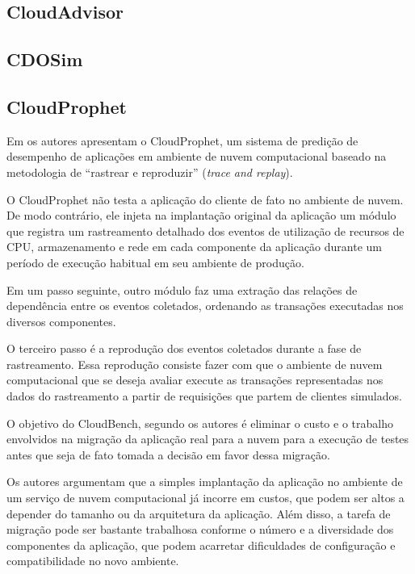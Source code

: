 \subsection{CloudAdvisor}
\cite{jung2013cloudadvisor}

\subsection{CDOSim}
\cite{fittkau2012cdosim}

\subsection{CloudProphet}
Em \cite{li2011cloudprophet} os autores apresentam o CloudProphet, um sistema de
predição de desempenho de aplicações em ambiente de nuvem computacional baseado 
na metodologia de ``rastrear e reproduzir'' (\textit{trace and replay}).

O CloudProphet não testa a aplicação do cliente de fato no ambiente de nuvem. De
modo contrário, ele injeta na implantação original da aplicação um módulo que 
registra um rastreamento detalhado dos eventos de utilização de recursos de CPU,
armazenamento e rede em cada componente da aplicação durante um período de 
execução habitual em seu ambiente de produção.

Em um passo seguinte, outro módulo faz uma extração das relações de dependência 
entre os eventos coletados, ordenando as transações executadas nos diversos 
componentes.

O terceiro passo é a reprodução dos eventos coletados durante a fase de 
rastreamento. Essa reprodução consiste fazer com que o ambiente de nuvem 
computacional que se deseja avaliar execute as transações representadas nos dados
do rastreamento a partir de requisições que partem de clientes simulados.
   
O objetivo do CloudBench, segundo os autores é eliminar o custo e o trabalho 
envolvidos na migração da aplicação real para a nuvem para a execução de testes 
antes que seja de fato tomada a decisão em favor dessa migração.

Os autores argumentam que a simples implantação da aplicação no ambiente de um
serviço de nuvem computacional já incorre em custos, que podem ser altos a 
depender do tamanho ou da arquitetura da aplicação. Além disso, a tarefa de
migração pode ser bastante trabalhosa conforme o número e a diversidade dos 
componentes da aplicação, que podem acarretar dificuldades de configuração e
compatibilidade no novo ambiente.

